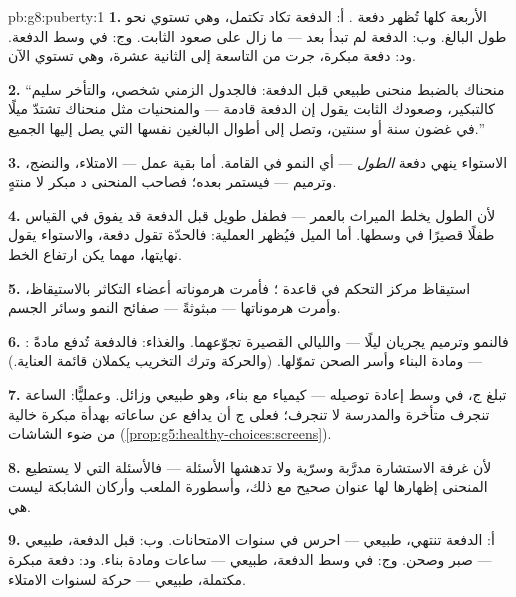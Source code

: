 \begin{solution}{pb:g8:puberty:1}
\textbf{1.} الأربعة كلها تُظهر دفعة . أ: الدفعة تكاد تكتمل،
وهي تستوي نحو طول البالغ. وب: الدفعة لم تبدأ بعد --- ما زال على
صعود  الثابت. وج: في وسط الدفعة. ود: دفعة مبكرة، جرت من
التاسعة إلى الثانية عشرة، وهي تستوي الآن.

\textbf{2.} ``منحناك بالضبط منحنى طبيعي قبل الدفعة: فالجدول الزمني
شخصي، والتأخر سليم كالتبكير، وصعودك الثابت يقول إن الدفعة قادمة ---
والمنحنيات مثل منحناك تشتدّ ميلًا في غضون سنة أو سنتين، وتصل إلى
أطوال البالغين نفسها التي يصل إليها الجميع.''

\textbf{3.} الاستواء ينهي دفعة \emph{الطول} --- أي النمو في
القامة. أما بقية عمل  --- الامتلاء، والنضج، وترميم  ---
فيستمر بعده؛ فصاحب المنحنى د مبكر لا منتهٍ.

\textbf{4.} لأن الطول يخلط الميراث بالعمر --- فطفل طويل قبل الدفعة
قد يفوق في القياس طفلًا قصيرًا في وسطها. أما الميل فيُظهر العملية:
فالحدّة تقول دفعة، والاستواء يقول نهايتها، مهما يكن ارتفاع الخط.

\textbf{5.} استيقاظ مركز التحكم في قاعدة ؛ فأمرت هرموناته
أعضاء التكاثر بالاستيقاظ، وأمرت هرموناتها --- مبثوثةً  ---
صفائح النمو وسائر الجسم.

\textbf{6.} : فالنمو وترميم  يجريان ليلًا --- والليالي
القصيرة تجوّعهما. والغذاء: فالدفعة تُدفع مادةً --- ومادة البناء
وأسر الصحن تموّلها. (والحركة وترك التخريب يكملان قائمة العناية.)

\textbf{7.}  تبلغ  ج،  في وسط إعادة توصيله ---
كيمياء مع بناء، وهو طبيعي وزائل. وعمليًّا: الساعة تنجرف متأخرة
والمدرسة لا تنجرف؛ فعلى ج أن يدافع عن ساعاته بهدأة مبكرة خالية من
ضوء الشاشات
(\cref{prop:g5:healthy-choices:screens}).

\textbf{8.} لأن غرفة الاستشارة مدرَّبة وسرّية ولا تدهشها الأسئلة
--- فالأسئلة التي لا يستطيع المنحنى إظهارها لها عنوان صحيح مع ذلك،
وأسطورة الملعب وأركان الشابكة ليست هي.

\textbf{9.} أ: الدفعة تنتهي، طبيعي --- احرس  في سنوات
الامتحانات. وب: قبل الدفعة، طبيعي --- صبر وصحن. وج: في وسط الدفعة،
طبيعي --- ساعات  ومادة بناء. ود: دفعة مبكرة مكتملة، طبيعي ---
حركة لسنوات الامتلاء.


\end{solution}
